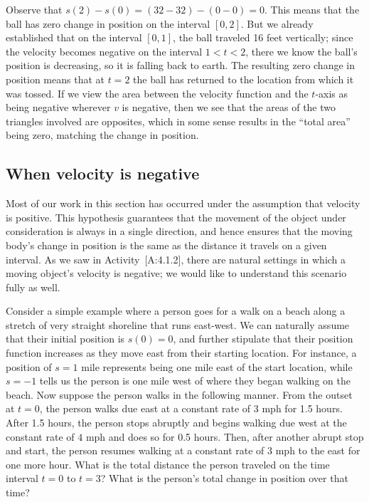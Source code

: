 Observe that \(s(2) - s(0) = (32 - 32) - (0 - 0) = 0\). This means that
the ball has zero change in position on the interval \([0,2]\). But we
already established that on the interval \([0,1]\), the ball traveled 16
feet vertically; since the velocity becomes negative on the interval
\(1 < t < 2\), there we know the ball's position is decreasing, so it is
falling back to earth. The resulting zero change in position means that
at \(t = 2\) the ball has returned to the location from which it was
tossed. If we view the area between the velocity function and the
\(t\)-axis as being negative wherever \(v\) is negative, then we see
that the areas of the two triangles involved are opposites, which in
some sense results in the ``total area'' being zero, matching the change
in position.

\subsection*{When velocity is negative}\label{when-velocity-is-negative}

Most of our work in this section has occurred under the assumption that
velocity is positive. This hypothesis guarantees that the movement of
the object under consideration is always in a single direction, and
hence ensures that the moving body's change in position is the same as
the distance it travels on a given interval. As we saw in
Activity~{[}A:4.1.2{]}, there are natural settings in which a moving
object's velocity is negative; we would like to understand this scenario
fully as well.

Consider a simple example where a person goes for a walk on a beach
along a stretch of very straight shoreline that runs east-west. We can
naturally assume that their initial position is \(s(0) = 0\), and
further stipulate that their position function increases as they move
east from their starting location. For instance, a position of \(s = 1\)
mile represents being one mile east of the start location, while
\(s = -1\) tells us the person is one mile west of where they began
walking on the beach. Now suppose the person walks in the following
manner. From the outset at \(t = 0\), the person walks due east at a
constant rate of \(3\) mph for 1.5 hours. After 1.5 hours, the person
stops abruptly and begins walking due west at the constant rate of \(4\)
mph and does so for 0.5 hours. Then, after another abrupt stop and
start, the person resumes walking at a constant rate of \(3\) mph to the
east for one more hour. What is the total distance the person traveled
on the time interval \(t = 0\) to \(t = 3\)? What is the person's total
change in position over that time?

